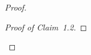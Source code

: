 \documentclass{article}
\theoremstyle{remark}
\theoremstyle{definition}
\DeclareMathOperator{\rk}{rk}
\DeclareMathOperator{\cl}{cl}
\newenvironment{subproof}[1][\proofname]{%
  \renewcommand{\qedsymbol}{$\blacksquare$}%
  \begin{proof}[#1]%
}{%
  \end{proof}%
}
\begin{document}
{\begin{proof}
\begin{subproof}[Proof of Claim~1.2]

\end{subproof}


\end{proof}}
\end{document}
